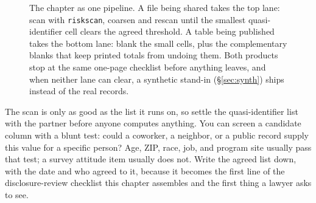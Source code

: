 \documentclass[
    a4paper,
    fontsize=10pt,
    twoside=true,
    numbers=noenddot,
]{kaobook}
\begin{document}
\begin{figure}[t]
\centering
{}
\caption[The release pipeline this chapter teaches]{The chapter as one pipeline. A file being shared takes the top lane: scan with \texttt{riskscan}, coarsen and rescan until the smallest quasi-identifier cell clears the agreed threshold. A table being published takes the bottom lane: blank the small cells, plus the complementary blanks that keep printed totals from undoing them. Both products stop at the same one-page checklist before anything leaves, and when neither lane can clear, a synthetic stand-in (\S\ref{sec:synth}) ships instead of the real records.}
\label{fig:ch14-viz-pipeline}
\end{figure}


The scan is only as good as the list it runs on, so settle the quasi-identifier list with the partner before anyone computes anything. You can screen a candidate column with a blunt test: could a coworker, a neighbor, or a public record supply this value for a specific person? Age, ZIP, race, job, and program site usually pass that test; a survey attitude item usually does not. Write the agreed list down, with the date and who agreed to it, because it becomes the first line of the disclosure-review checklist this chapter assembles and the first thing a lawyer asks to see.
\end{document}
